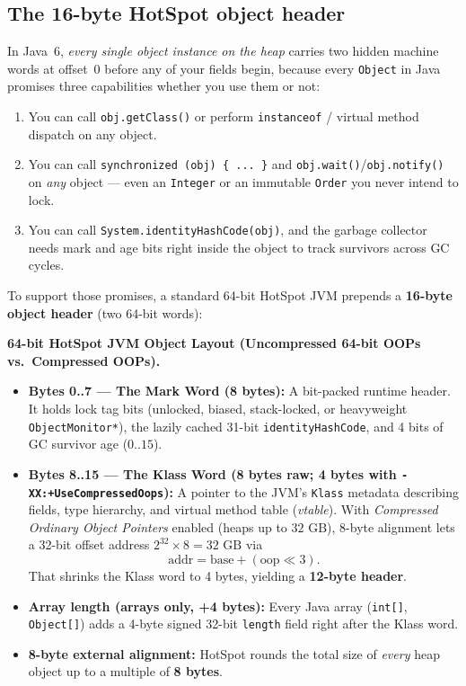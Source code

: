 \subsection{The 16-byte HotSpot object header}

In Java~6, \emph{every single object instance on the heap} carries two hidden machine words at offset~0 before any of your fields begin, because every \texttt{Object} in Java promises three capabilities whether you use them or not:
\begin{enumerate}
  \item You can call \texttt{obj.getClass()} or perform \texttt{instanceof} / virtual method dispatch on any object.
  \item You can call \texttt{synchronized (obj) \{ ... \}} and \texttt{obj.wait()}/\texttt{obj.notify()} on \emph{any} object --- even an \texttt{Integer} or an immutable \texttt{Order} you never intend to lock.
  \item You can call \texttt{System.identityHashCode(obj)}, and the garbage collector needs mark and age bits right inside the object to track survivors across GC cycles.
\end{enumerate}

To support those promises, a standard 64-bit HotSpot JVM prepends a \textbf{16-byte object header} (two 64-bit words):

\begin{formalbox}
\textbf{64-bit HotSpot JVM Object Layout (Uncompressed 64-bit OOPs vs.\ Compressed OOPs).}
\begin{itemize}
  \item \textbf{Bytes 0..7 --- The Mark Word (8 bytes):} A bit-packed runtime header. It holds lock tag bits (unlocked, biased, stack-locked, or heavyweight \texttt{ObjectMonitor*}), the lazily cached 31-bit \texttt{identityHashCode}, and 4 bits of GC survivor age ($0..15$).
  \item \textbf{Bytes 8..15 --- The Klass Word (8 bytes raw; 4 bytes with \texttt{-XX:+UseCompressedOops}):} A pointer to the JVM's \texttt{Klass} metadata describing fields, type hierarchy, and virtual method table (\emph{vtable}). With \emph{Compressed Ordinary Object Pointers} enabled (heaps up to $32\text{ GB}$), 8-byte alignment lets a 32-bit offset address $2^{32} \times 8 = 32\text{ GB}$ via \[ \text{addr} = \text{base} + (\text{oop} \ll 3). \] That shrinks the Klass word to 4 bytes, yielding a \textbf{12-byte header}.
  \item \textbf{Array length (arrays only, +4 bytes):} Every Java array (\texttt{int[]}, \texttt{Object[]}) adds a 4-byte signed 32-bit \texttt{length} field right after the Klass word.
  \item \textbf{8-byte external alignment:} HotSpot rounds the total size of \emph{every} heap object up to a multiple of \textbf{8 bytes}.
\end{itemize}
\end{formalbox}

